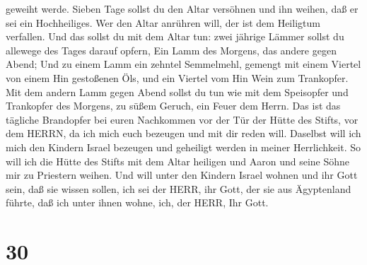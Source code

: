 geweiht werde.  Sieben Tage sollst du den Altar versöhnen
und ihn weihen, daß er sei ein Hochheiliges. Wer den Altar anrühren
will, der ist dem Heiligtum verfallen.  Und das sollst du
mit dem Altar tun: zwei jährige Lämmer sollst du allewege des Tages
darauf opfern,  Ein Lamm des Morgens, das andere gegen
Abend;  Und zu einem Lamm ein zehntel Semmelmehl, gemengt
mit einem Viertel von einem Hin gestoßenen Öls, und ein Viertel vom Hin
Wein zum Trankopfer.  Mit dem andern Lamm gegen Abend
sollst du tun wie mit dem Speisopfer und Trankopfer des Morgens, zu
süßem Geruch, ein Feuer dem Herrn.  Das ist das tägliche
Brandopfer bei euren Nachkommen vor der Tür der Hütte des Stifts, vor
dem HERRN, da ich mich euch bezeugen und mit dir reden will.
 Daselbst will ich mich den Kindern Israel bezeugen und
geheiligt werden in meiner Herrlichkeit.  So will ich die
Hütte des Stifts mit dem Altar heiligen und Aaron und seine Söhne mir zu
Priestern weihen.  Und will unter den Kindern Israel wohnen
und ihr Gott sein,  daß sie wissen sollen, ich sei der
HERR, ihr Gott, der sie aus Ägyptenland führte, daß ich unter ihnen
wohne, ich, der HERR, Ihr Gott.

\hypertarget{section-29}{%
\section{30}\label{section-29}}

